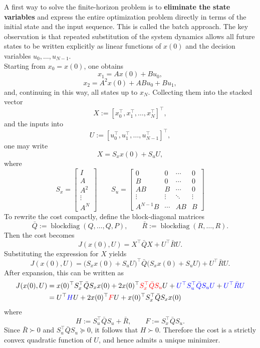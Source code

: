 A first way to solve the finite-horizon problem is to \textbf{eliminate the state variables} and express the entire optimization problem directly in terms of the initial state and the input sequence. This is called the batch approach. The key observation is that repeated substitution of the system dynamics allows all future states to be written explicitly as linear functions of $x(0)$ and the decision variables $u_0,\dots,u_{N-1}$.\\
Starting from $x_0=x(0)$, one obtains
\[
x_1 = Ax(0)+Bu_0,
\]
\[
x_2 = A^2x(0)+ABu_0+Bu_1,
\]
and, continuing in this way, all states up to $x_N$. Collecting them into the stacked vector
\[
X := [x_0^\top,x_1^\top,\dots,x_N^\top]^\top,
\]
and the inputs into
\[
U := [u_0^\top,u_1^\top,\dots,u_{N-1}^\top]^\top,
\]
one may write
\[
X = S_x x(0) + S_u U,
\]
where
$$S_x = \begin{bmatrix}
    I \\ A \\ A^2 \\ \vdots \\ A^N
\end{bmatrix} \qquad S_u = \begin{bmatrix}
    0 & 0 & \cdots & 0 \\
    B & 0 & \cdots & 0 \\
    AB & B & \cdots & 0 \\
    \vdots & \vdots & \ddots & \vdots \\
    A^{N-1}B & \cdots & AB & B
\end{bmatrix}$$
To rewrite the cost compactly, define the block-diagonal matrices
\[
\bar{Q} := \operatorname{blockdiag}(Q,\dots,Q,P),
\qquad
\bar{R} := \operatorname{blockdiag}(R,\dots,R).
\]
Then the cost becomes
\[
J(x(0),U)=X^\top \bar{Q}X + U^\top \bar{R}U.
\]
Substituting the expression for $X$ yields
\[
J(x(0),U)
=
\bigl(S_xx(0)+S_uU\bigr)^\top \bar{Q}\bigl(S_xx(0)+S_uU\bigr)+U^\top \bar{R}U.
\]
After expansion, this can be written as
\begin{align*}
J(x(0),U) &= x(0)^\top S_x^\top \bar{Q} S_x x(0) + 2x(0)^\top \textcolor{red}{S_x^\top \bar{Q} S_u} U +\textcolor{blue}{U^\top S_u^\top \bar{Q} S_u U}+ \textcolor{blue}{U^\top \bar{R}U}\\
&=U^\top \textcolor{blue}{H} U + 2x(0)^\top \textcolor{red}{F} U + x(0)^\top S_x^\top \bar{Q} S_x x(0)
\end{align*}
where
\[
H := S_u^\top \bar{Q} S_u + \bar{R},
\qquad
F := S_x^\top \bar{Q} S_u.
\]
Since $\bar{R}\succ 0$ and $S_u^\top \bar{Q}S_u \succeq 0$, it follows that $H\succ 0$. Therefore the cost is a strictly convex quadratic function of $U$, and hence admits a unique minimizer.\\
